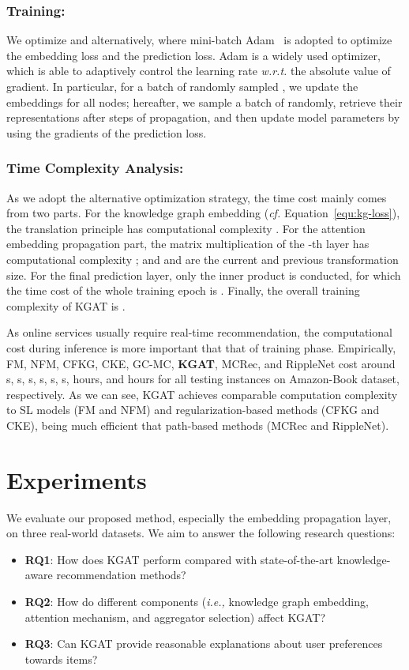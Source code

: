 \documentclass[sigconf]{acmart}
\newcommand{\ie}{\emph{i.e., }}
\newcommand{\wrt}{\emph{w.r.t. }}
\newcommand{\cf}{\emph{cf. }}
\theoremstyle{definition}
\begin{document}
\subsubsection{\textbf{Training:}}
We optimize  and  alternatively, where mini-batch Adam~\cite{Adam} is adopted to optimize the embedding loss and the prediction loss.
Adam is a widely used optimizer, which is able to adaptively control the learning rate \wrt the absolute value of gradient.
In particular, for a batch of randomly sampled , we update the embeddings for all nodes; hereafter, we sample a batch of  randomly, retrieve their representations after  steps of propagation, and then update model parameters by using the gradients of the prediction loss.

\subsubsection{\textbf{Time Complexity Analysis:}}
As we adopt the alternative optimization strategy, the time cost mainly comes from two parts.
For the knowledge graph embedding (\cf Equation~\eqref{equ:kg-loss}), the translation principle has computational complexity .
For the attention embedding propagation part, the matrix multiplication of the -th layer has computational complexity ; and  and  are the current and previous transformation size.
For the final prediction layer, only the inner product is conducted, for which the time cost of the whole training epoch is .
Finally, the overall training complexity of KGAT is .

As online services usually require real-time recommendation, the computational cost during inference is more important that that of training phase. Empirically, FM, NFM, CFKG, CKE, GC-MC, \textbf{KGAT}, MCRec, and RippleNet cost around s, s, s, s, s, s,  hours, and  hours for all testing instances on Amazon-Book dataset, respectively.
As we can see, KGAT achieves comparable computation complexity to SL models (FM and NFM) and regularization-based methods (CFKG and CKE), being much efficient that path-based methods (MCRec and RippleNet).







 \section{Experiments}

We evaluate our proposed method, especially the embedding propagation layer, on three real-world datasets.
We aim to answer the following research questions:
\begin{itemize}[leftmargin=*]
	\item \textbf{RQ1}: How does KGAT perform compared with state-of-the-art knowledge-aware recommendation methods?
	\item \textbf{RQ2}: How do different components (\ie knowledge graph embedding, attention mechanism, and aggregator selection) affect KGAT?
\item \textbf{RQ3}: Can KGAT provide reasonable explanations about user preferences towards items?
\end{itemize}
\end{document}
